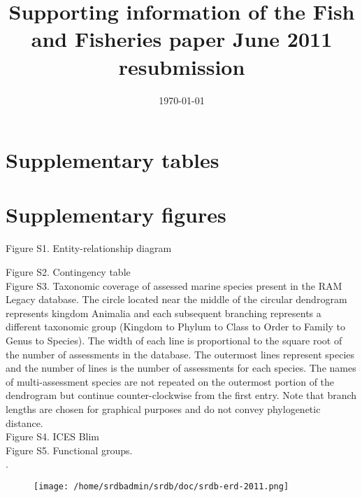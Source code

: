 \documentclass[letterpaper,review,authoryear,12pt]{article}
\title{Supporting information of the Fish and Fisheries paper June 2011 resubmission}
\date{\today}
\begin{document}
\renewcommand{\figurename}{Fig. S}
\renewcommand{\tablename}{Table S}

\maketitle
\section{Supplementary tables}

\begin{landscape}
\begin{tiny}

\end{tiny}
\end{landscape}



\section{Supplementary figures}
\noindent Figure S1. Entity-relationship diagram


\noindent Figure S2. Contingency table\\ 

\noindent Figure S3. Taxonomic coverage of assessed marine species
present in the RAM Legacy database. The circle located near the middle
of the circular dendrogram represents kingdom Animalia and each
subsequent branching represents a different taxonomic group (Kingdom
to Phylum to Class to Order to Family to Genus to Species). The width
of each line is proportional to the square root of the number of
assessments in the database. The outermost lines represent species and
the number of lines is the number of assessments for each species. The
names of multi-assessment species are not repeated on the outermost
portion of the dendrogram but continue counter-clockwise from the
first entry.  Note that branch lengths are chosen for graphical
purposes and do not convey phylogenetic distance.\\

\noindent Figure S4. ICES Blim\\ 

\noindent Figure S5. Functional groups.\\ 


.\begin{figure}
\begin{center}
\texttt{[image: /home/srdbadmin/srdb/doc/srdb-erd-2011.png]}
\end{center}
\caption{ }\label{fig:erd}
\end{figure}
\end{document}
